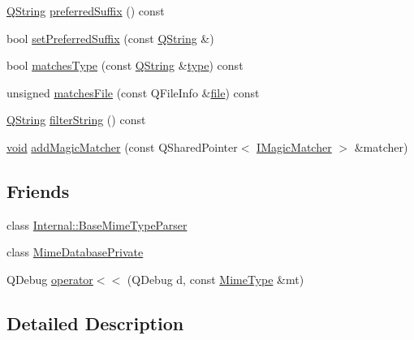 \begin{DoxyCompactItemize}
\item 
\hyperlink{group___u_a_v_objects_plugin_gab9d252f49c333c94a72f97ce3105a32d}{\-Q\-String} \hyperlink{group___core_plugin_ga8951b896132754af79a17a9875d48aba}{preferred\-Suffix} () const 
\item 
bool \hyperlink{group___core_plugin_ga6bbf75571b9386bdef65e32b532bdf17}{set\-Preferred\-Suffix} (const \hyperlink{group___u_a_v_objects_plugin_gab9d252f49c333c94a72f97ce3105a32d}{\-Q\-String} \&)
\item 
bool \hyperlink{group___core_plugin_gae6e8bb4b51c90fdbc1ff3a06feb608dd}{matches\-Type} (const \hyperlink{group___u_a_v_objects_plugin_gab9d252f49c333c94a72f97ce3105a32d}{\-Q\-String} \&\hyperlink{group___core_plugin_ga4dc87bc5d4687aaa46b634677bdafea5}{type}) const 
\item 
unsigned \hyperlink{group___core_plugin_gad2a83cd6a3497a5250760912c4cf765d}{matches\-File} (const \-Q\-File\-Info \&\hyperlink{uavobjecttemplate_8m_a97c04efa65bcf0928abf9260bc5cbf46}{file}) const 
\item 
\hyperlink{group___u_a_v_objects_plugin_gab9d252f49c333c94a72f97ce3105a32d}{\-Q\-String} \hyperlink{group___core_plugin_gaf9cafbc06029145ed37653154dc98322}{filter\-String} () const 
\item 
\hyperlink{group___u_a_v_objects_plugin_ga444cf2ff3f0ecbe028adce838d373f5c}{void} \hyperlink{group___core_plugin_ga520da2732b236a8aa18784ae485668bc}{add\-Magic\-Matcher} (const \-Q\-Shared\-Pointer$<$ \hyperlink{class_core_1_1_i_magic_matcher}{\-I\-Magic\-Matcher} $>$ \&matcher)
\end{DoxyCompactItemize}
\subsection*{\-Friends}
\begin{DoxyCompactItemize}
\item 
class \hyperlink{group___core_plugin_gaede3caef30fcd32e46c58bcee0316978}{\-Internal\-::\-Base\-Mime\-Type\-Parser}
\item 
class \hyperlink{group___core_plugin_gaed8cc5f0fa519bf8b2eb85b880f76d7c}{\-Mime\-Database\-Private}
\item 
\-Q\-Debug \hyperlink{group___core_plugin_ga0642e8bd073fde915ffb78e5b2245d8e}{operator$<$$<$} (\-Q\-Debug d, const \hyperlink{class_core_1_1_mime_type}{\-Mime\-Type} \&mt)
\end{DoxyCompactItemize}


\subsection{\-Detailed \-Description}


